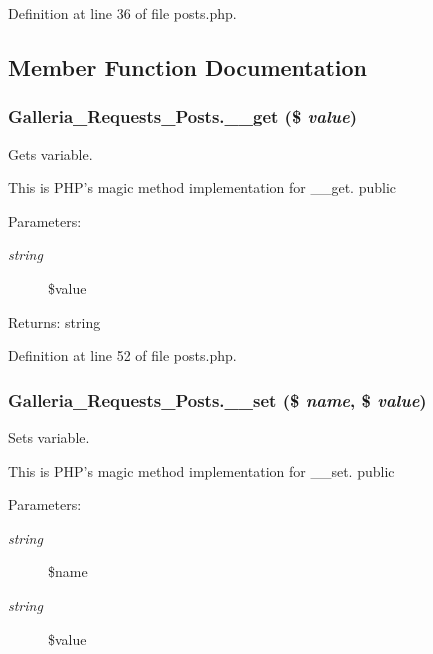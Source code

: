 Definition at line 36 of file posts.php.

\subsection{Member Function Documentation}
\subsubsection{\setlength{\rightskip}{0pt plus 5cm}Galleria\_\-Requests\_\-Posts.\_\-\_\-get (\$ {\em value})}\label{classGalleria__Requests__Posts_76d8cbdc21399d08a21b1cf9680c88fe}


Gets variable.

This is PHP's magic method implementation for \_\-\_\-get.  public \begin{Desc}
\item[Parameters:]
\begin{description}
\item[{\em string}]\$value \end{description}
\end{Desc}
\begin{Desc}
\item[Returns:]string \end{Desc}


Definition at line 52 of file posts.php.
\subsubsection{\setlength{\rightskip}{0pt plus 5cm}Galleria\_\-Requests\_\-Posts.\_\-\_\-set (\$ {\em name}, \$ {\em value})}\label{classGalleria__Requests__Posts_51a819a944b5804da1fe33681e73ab8a}


Sets variable.

This is PHP's magic method implementation for \_\-\_\-set.  public \begin{Desc}
\item[Parameters:]
\begin{description}
\item[{\em string}]\$name \item[{\em string}]\$value \end{description}
\end{Desc}


